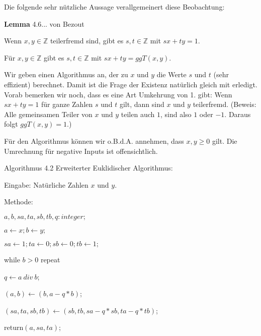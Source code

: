 \documentclass[a4paper]{article}
\begin{document}
\begin{multicols}{3}
    Die folgende sehr nützliche Aussage verallgemeinert diese Beobachtung:

    \textbf{Lemma} 4.6... von Bezout
    \begin{enumerate*}
        \item Wenn $x,y\in\mathbb{Z}$ teilerfremd sind, gibt es $s,t\in\mathbb{Z}$ mit $sx+ty= 1$.
        \item Für $x,y\in\mathbb{Z}$ gibt es $s,t\in\mathbb{Z}$ mit $sx+ty= ggT(x,y)$.
    \end{enumerate*}

    Wir geben einen Algorithmus an, der zu $x$ und $y$ die Werte $s$ und $t$ (sehr effizient) berechnet. Damit ist die Frage der Existenz natürlich gleich mit erledigt. Vorab bemerken wir noch, dass es eine Art Umkehrung von 1. gibt: Wenn $sx+ty= 1$ für ganze Zahlen $s$ und $t$ gilt, dann sind $x$ und $y$ teilerfremd. (Beweis: Alle gemeinsamen Teiler von $x$ und $y$ teilen auch $1$, sind also $1$ oder $-1$. Daraus folgt $ggT(x,y) = 1$.)

    Für den Algorithmus können wir o.B.d.A. annehmen, dass $x,y\geq 0$ gilt. Die Umrechnung für negative Inputs ist offensichtlich.

    Algorithmus 4.2 Erweiterter Euklidischer Algorithmus:
    \begin{itemize*}
        \item Eingabe: Natürliche Zahlen $x$ und $y$.
        \item Methode:
        \begin{enumerate*}
            \item $a,b,sa,ta,sb,tb,q:integer;$
            \item $a\leftarrow x; b\leftarrow y;$
            \item $sa\leftarrow 1; ta\leftarrow 0; sb\leftarrow 0; tb\leftarrow 1;$
            \item while $b> 0$ repeat
            \begin{enumerate*}
                \item $q\leftarrow a\ div\ b$;
                \item $(a,b)\leftarrow (b,a-q*b)$;
                \item $(sa,ta,sb,tb)\leftarrow (sb,tb,sa-q*sb,ta-q*tb)$;
            \end{enumerate*}
            \item return$(a,sa,ta)$;
        \end{enumerate*}
    \end{itemize*}


\end{multicols}
\end{document}
